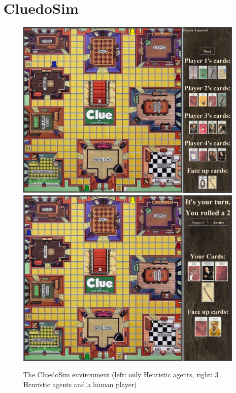 \documentclass[msc, ai, logo, twoside, notimes, parskip, leftchapter, normalheadings]{infthesis}
\begin{document}
\section{CluedoSim}
\begin{figure}[h]
\caption{The CluedoSim environment (left: only Heuristic agents, right: 3 Heuristic agents and a human player)}
\centering
\includegraphics[scale=.3]{figures/cluedoSim}
\includegraphics[scale=.3]{figures/humanCluedoSim}
\end{figure}
\end{document}
